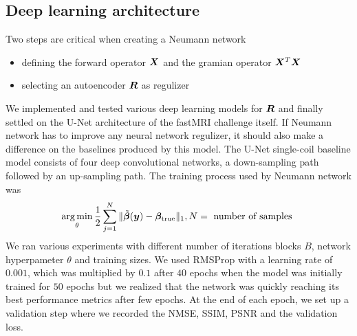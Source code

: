 \documentclass{article}
\begin{document}
\subsection{Deep learning architecture}
Two steps are critical when creating a Neumann network
\begin{itemize}
\item defining the forward operator $\bm{X}$ and the gramian operator $\bm{X}^T \bm{X}$
\item selecting an autoencoder $\bm{R}$ as regulizer
\end{itemize}

We implemented and tested various deep learning models for $\bm{R}$ and finally settled on the U-Net architecture  of the fastMRI challenge itself. If Neumann network has to improve any neural network regulizer, it should also make a difference on the baselines produced by this model. The U-Net single-coil baseline model consists of four deep convolutional networks, a down-sampling path followed by an up-sampling path. The training process used by Neumann network was
$$
	\operatorname*{arg\,min}_\theta \frac{1}{2} \sum_{j=1}^N \| \tilde{\bm{\beta}}(\bm{y}) - \bm{\beta}_{\text{true}} \|_1, N=\text{ number of samples }
$$
     We ran various experiments with different number of iterations blocks $B$, network hyperpameter $\theta$ and training sizes.
     We used RMSProp with a learning rate of $0.001$, which was multiplied by $0.1$ after $40$ epochs when the model was initially trained for $50$ epochs but we realized that the network was quickly reaching its best performance metrics after few epochs. At the end of each epoch, we set up a validation step where we recorded the NMSE, SSIM, PSNR and the validation loss.
   
\end{document}
